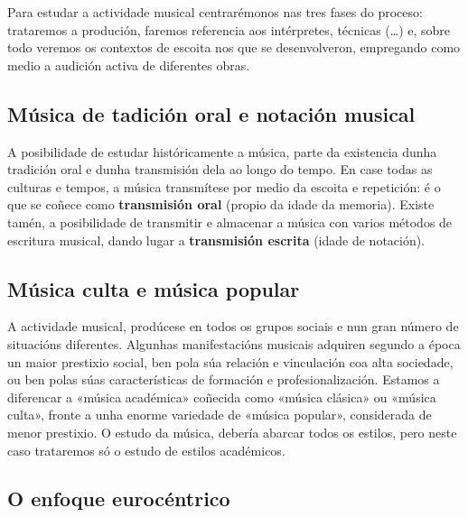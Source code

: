 \documentclass[a4paper, twoside]{templates/ociamthesis}
\begin{document}
Para estudar a actividade musical centrarémonos nas tres fases do proceso: trataremos a produción, faremos referencia aos intérpretes, técnicas (\ldots) e, sobre todo veremos os contextos de escoita nos que se desenvolveron, empregando como medio a audición activa de diferentes obras.

\hypertarget{muxfasica-de-tadiciuxf3n-oral-e-notaciuxf3n-musical}{%
\subsection*{Música de tadición oral e notación musical}\label{muxfasica-de-tadiciuxf3n-oral-e-notaciuxf3n-musical}}

A posibilidade de estudar históricamente a música, parte da existencia dunha tradición oral e dunha transmisión dela ao longo do tempo. En case todas as culturas e tempos, a música transmítese por medio da escoita e repetición: é o que se coñece como \textbf{transmisión oral} (propio da idade da memoria). Existe tamén, a posibilidade de transmitir e almacenar a música con varios métodos de escritura musical, dando lugar a \textbf{transmisión escrita} (idade de notación).

\hypertarget{muxfasica-culta-e-muxfasica-popular}{%
\subsection*{Música culta e música popular}\label{muxfasica-culta-e-muxfasica-popular}}

A actividade musical, prodúcese en todos os grupos sociais e nun gran número de situacións diferentes. Algunhas manifestacións musicais adquiren segundo a época un maior prestixio social, ben pola súa relación e vinculación coa alta sociedade, ou ben polas súas características de formación e profesionalización. Estamos a diferencar a «música académica» coñecida como «música clásica» ou «música culta», fronte a unha enorme variedade de «música popular», considerada de menor prestixio. O estudo da música, debería abarcar todos os estilos, pero neste caso trataremos só o estudo de estilos académicos.

\hypertarget{o-enfoque-eurocuxe9ntrico}{%
\subsection*{O enfoque eurocéntrico}\label{o-enfoque-eurocuxe9ntrico}}
\end{document}
